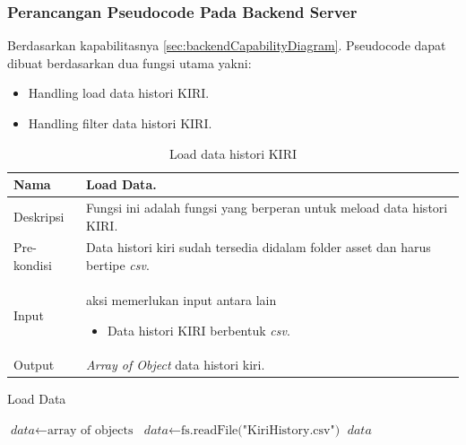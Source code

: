 \subsubsection{Perancangan Pseudocode Pada Backend Server}
Berdasarkan kapabilitasnya \ref{sec:backendCapabilityDiagram}.  Pseudocode dapat dibuat berdasarkan dua fungsi utama yakni:
\begin{itemize}
    \item Handling load data histori KIRI.
    \item Handling filter data histori KIRI.
\end{itemize}

\begin{table}[H]
    \centering
       \caption{Load data histori KIRI}
    \begin{tabular}{|p{3cm}|p{10cm}|}
    \hline
        Nama & Load Data.\\
    \hline
    \hline
        Deskripsi & Fungsi ini adalah fungsi yang berperan untuk meload data histori KIRI.
        \\
    \hline
        Pre-kondisi & Data histori kiri sudah tersedia didalam folder asset dan harus bertipe \textit{csv}.\\
    \hline
        Input & 
        aksi memerlukan input antara lain 
        \begin{itemize}
            \item Data histori KIRI berbentuk \textit{csv}.
        \end{itemize}
       \\
       \hline
        Output & 
        \textit{Array of Object} data histori kiri.
       \\
    \hline
    \end{tabular}
\end{table}

\begin{algorithm}[htbp]
\caption{Load Data}
\begin{algorithmic}[1]
\State $\textit{data} \gets \text{array of objects}$
\State $\textit{data} \gets \text{fs.readFile("KiriHistory.csv")}$
\State \Return $\textit{data}$
\EndIf
\EndProcedure
\end{algorithmic}
\end{algorithm}


